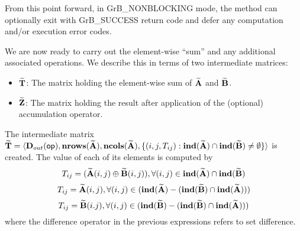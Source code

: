 From this point forward, in {\sf GrB\_NONBLOCKING} mode, the method can 
optionally exit with {\sf GrB\_SUCCESS} return code and defer any computation 
and/or execution error codes.

We are now ready to carry out the element-wise ``sum'' and any additional 
associated operations.  We describe this in terms of two intermediate matrices:
\begin{itemize}
    \item ${\bf \widetilde{T}}$: The matrix holding the element-wise sum of
    ${\bf \widetilde{A}}$ and ${\bf \widetilde{B}}$.
    \item ${\bf \widetilde{Z}}$: The matrix holding the result after 
    application of the (optional) accumulation operator.
\end{itemize}

The intermediate matrix ${\bf \widetilde{T}} = \langle
\mbox{$\mathbf{D}_{out}$}({\sf op}), \bold{nrows}({\bf \widetilde{A}}), \bold{ncols}({\bf \widetilde{A}}),
\{(i,j,T_{ij}) : \bold{ind}({\bf \widetilde{A}}) \cap 
\bold{ind}({\bf \widetilde{B}}) \neq \emptyset \} \rangle$
is created.  The value of each of its elements is computed by 
\[T_{ij} = ({\bf \widetilde{A}}(i,j) \oplus {\bf \widetilde{B}}(i,j)), \forall (i,j) \in \bold{ind}({\bf \widetilde{A}}) \cap \bold{ind}({\bf \widetilde{B}})\]
\[T_{ij} = {\bf \widetilde{A}}(i,j), \forall (i,j) \in (\bold{ind}({\bf \widetilde{A}}) - (\bold{ind}({\bf \widetilde{B}}) \cap \bold{ind}({\bf \widetilde{A}})))\]
\[T_{ij} = {\bf \widetilde{B}}(i.j), \forall (i,j) \in (\bold{ind}({\bf \widetilde{B}}) - (\bold{ind}({\bf \widetilde{B}}) \cap \bold{ind}({\bf \widetilde{A}})))\]
where the difference operator in the previous expressions refers to set difference.




